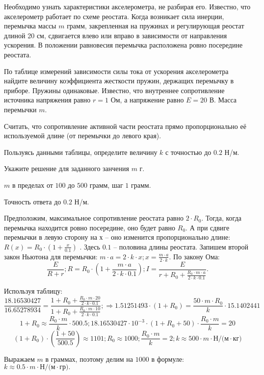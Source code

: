 
Необходимо узнать характеристики
акселерометра, не разбирая его. Известно, что акселерометр работает по схеме реостата. Когда возникает сила инерции,
перемычка массы $m$ грамм, закрепленная на пружинах и регулирующая реостат длиной
20 см, сдвигается влево или
вправо в зависимости от направления ускорения. В положении равновесия перемычка
расположена ровно посередине реостата.


По таблице измерений зависимости силы тока от
ускорения акселерометра найдите величину коэффициента жесткости пружин, держащих перемычку в приборе. Пружины
одинаковые. Известно, что
внутреннее сопротивление источника напряжения равно $r = 1$ Ом, а напряжение равно $E = 20$ В.  Масса
перемычки $m$.


Считать, что сопротивление активной части реостата прямо
пропорционально её используемой длине (от перемычки до левого края).

Пользуясь данными таблицы, определите величину $k$ с точностью до $0.2$ Н/м.

Укажите решение для заданного занчения $m$ г.

\paramSection

$m$ в пределах от $100$ до $500$ грамм, шаг $1$ грамм.  

Точность ответа  до  $0.2$  Н/м.

\solutionSection

Предположим, максимальное сопротивление реостата равно $2 \cdot R_0$. Тогда, когда перемычка находится 
ровно посередине, оно будет равно $R_0$. А при сдвиге перемычки в левую сторону на $х$ – оно изменится 
пропорционально длине: \linebreak $R(x)=R_0 \cdot (1+\frac{x}{0.1})$ . Здесь $0.1$ – половина длины реостата. 
Запишем второй закон Ньютона для перемычки:
$m \cdot a=2 \cdot k \cdot x;  x=\frac{m \cdot a}{2 \cdot k}$. По закону Ома:   
$$\frac{E}{R+r}; R=R_0 \cdot \left(1+\frac{m \cdot a}{2 \cdot k \cdot 0.1}\right); 
I=  \frac{E}{r+R_0+\frac{R_0 \cdot m \cdot a}{2 \cdot k \cdot 0.1}}.$$ 

Используя таблицу:
$$\frac{18.16530427}{16.65278934}=\frac{1+R_0+\frac{R_0 \cdot m \cdot 20}{2 \cdot k \cdot 0.1}}{1+R_0+\frac{R_0 \cdot m \cdot 10}{2 \cdot k \cdot 0.1}}; \Rightarrow  1.51251493 \cdot (1+R_0 )=\frac{50 \cdot m \cdot R_0}{k} \cdot 15.1402441$$
$$1+R_0 \approx   \frac{R_0 \cdot m}{k}   \cdot 500.5;  18.16530427 \cdot 10^{-3} \cdot (1+R_0+50) \cdot \frac{R_0 \cdot m}{k}=20$$
$$(1+R_0 ) \cdot \left(\frac{1+50}{500.5}\right) \approx 1101;  R_0 \approx 1000;   \frac{R_0 \cdot m}{k}=2; k \approx 500 \cdot m \cdot \text{Н/(м} \cdot \text{кг}) $$  

Выражаем $m$ в граммах, поэтому делим на $1000$ в формуле:  $k \approx 0.5 \cdot m \cdot \text{Н/(м} \cdot \text{гр)}   .$

